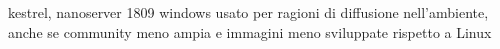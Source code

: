 kestrel, nanoserver 1809
windows usato per ragioni di diffusione nell'ambiente, anche se community meno ampia e immagini meno sviluppate rispetto a Linux